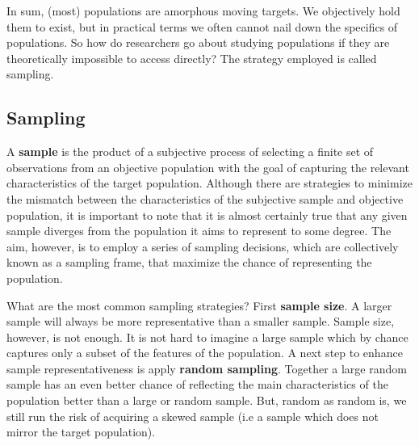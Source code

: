 \documentclass[
  letterpaper,
]{latex/krantz}
\begin{document}
In sum, (most) populations are amorphous moving targets. We objectively
hold them to exist, but in practical terms we often cannot nail down the
specifics of populations. So how do researchers go about studying
populations if they are theoretically impossible to access directly? The
strategy employed is called sampling.

\hypertarget{sampling}{%
\subsection{Sampling}\label{sampling}}

A \textbf{sample} is the product of a subjective process
of selecting a finite set of observations from an objective population
with the goal of capturing the relevant characteristics of the target
population. Although there are strategies to minimize the mismatch
between the characteristics of the subjective sample and objective
population, it is important to note that it is almost certainly true
that any given sample diverges from the population it aims to represent
to some degree. The aim, however, is to employ a series of sampling
decisions, which are collectively known as a sampling frame, that
maximize the chance of representing the population.

What are the most common sampling strategies? First
\textbf{sample size}. A larger sample will always be
more representative than a smaller sample. Sample size, however, is not
enough. It is not hard to imagine a large sample which by chance
captures only a subset of the features of the population. A next step to
enhance sample representativeness is apply \textbf{random sampling}.
Together a large random sample has an even better chance of reflecting
the main characteristics of the population better than a large or random
sample. But, random as random is, we still run the risk of acquiring a
skewed sample (i.e a sample which does not mirror the target
population).
\end{document}
